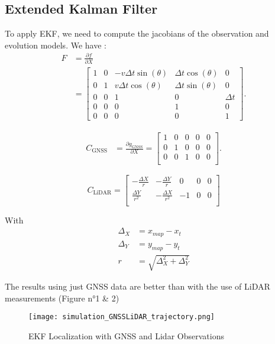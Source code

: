 \documentclass[conference]{IEEEtran}
\begin{document}
\subsection{Extended Kalman Filter}

To apply EKF, we need to compute the jacobians of the observation and evolution models. We have :
\begin{align*}
    F &= \frac{\partial f}{\partial X} \\ 
    &=
    \begin{bmatrix}
    1 & 0 & -v \Delta t \sin(\theta) & \Delta t \cos(\theta) & 0 \\
    0 & 1 & v \Delta t \cos(\theta) & \Delta t \sin(\theta) & 0 \\
    0 & 0 & 1 & 0 & \Delta t \\
    0 & 0 & 0 & 1 & 0 \\
    0 & 0 & 0 & 0 & 1
    \end{bmatrix}.
\end{align*}

\begin{align*}
    C_{\text{GNSS}} &= \frac{\partial g_\text{GNSS}}{\partial X} =
    \begin{bmatrix}
    1 & 0 & 0 & 0 & 0\\
    0 & 1 & 0 & 0 & 0\\
    0 & 0 & 1 & 0 & 0\\
    \end{bmatrix}.
\end{align*}

\[
C_{\text{LiDAR}} =
\begin{bmatrix}
-\frac{\Delta X}{r} & -\frac{\Delta Y}{r} & 0 & 0 & 0 \\
\frac{\Delta Y}{r^2} & -\frac{\Delta X}{r^2} & -1 & 0 & 0 \\
\end{bmatrix}
\]

With 
\begin{align*}
    \Delta_X &= x_{map} - x_t \\ 
    \Delta_Y &= y_{map} - y_t \\ 
    r &= \sqrt{\Delta_X^2 + \Delta_Y^2}
\end{align*}

The results using just GNSS data are better than with the use of LiDAR measurements (Figure n°1 \& 2)

\begin{figure}[H]
    \centering
    \texttt{[image: simulation\_GNSSLiDAR\_trajectory.png]}
    \caption{EKF Localization with GNSS and Lidar Observations}
    \label{fig:enter-label}
\end{figure}
\end{document}
